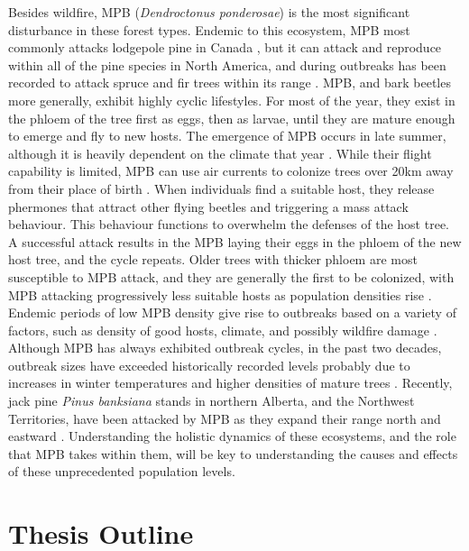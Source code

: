 Besides wildfire, MPB (\textit{Dendroctonus ponderosae}) is the most significant disturbance in these forest types. Endemic to this ecosystem, MPB most commonly attacks lodgepole pine in Canada \cite{safranyik2007mountain}, but it can attack and reproduce within all of the pine species in North America, and during outbreaks has been recorded to attack spruce and fir trees within its range \cite{gibson2009mountain}. MPB, and bark beetles more generally, exhibit highly cyclic lifestyles. For most of the year, they exist in the phloem of the tree first as eggs, then as larvae, until they are mature enough to emerge and fly to new hosts. The emergence of MPB occurs in late summer, although it is heavily dependent on the climate that year \cite{bentz2014mountain}. While their flight capability is limited, MPB can use air currents to colonize trees over 20km away from their place of birth \cite{shegelski2019morphological}. When individuals find a suitable host, they release phermones that attract other flying beetles and triggering a mass attack behaviour. This behaviour functions to overwhelm the defenses of the host tree. A successful attack results in the MPB laying their eggs in the phloem of the new host tree, and the cycle repeats. Older trees with thicker phloem are most susceptible to MPB attack, and they are generally the first to be colonized, with MPB attacking progressively less suitable hosts as population densities rise \cite{safranyik2007mountain}. Endemic periods of low MPB density give rise to outbreaks based on a variety of factors, such as density of good hosts, climate, and possibly wildfire damage \cite{safranyik2007mountain}. Although MPB has always exhibited outbreak cycles, in the past two decades, outbreak sizes have exceeded historically recorded levels probably due to increases in winter temperatures and higher densities of mature trees \cite{bentz2010climate,safranyik2007mountain}. Recently, jack pine \textit{Pinus banksiana} stands in northern Alberta, and the Northwest Territories, have been attacked by MPB as they expand their range north and eastward \cite{cudmore2010climate,nrcanmpb}. Understanding the holistic dynamics of these ecosystems, and the role that MPB takes within them, will be key to understanding the causes and effects of these unprecedented population levels. 

\section{Thesis Outline}

